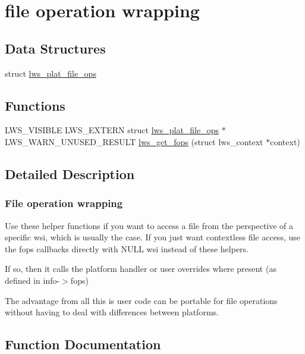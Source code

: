 \hypertarget{group__fops}{}\section{file operation wrapping}
\label{group__fops}
\subsection*{Data Structures}
\begin{DoxyCompactItemize}
\item 
struct \hyperlink{structlws__plat__file__ops}{lws\+\_\+plat\+\_\+file\+\_\+ops}
\end{DoxyCompactItemize}
\subsection*{Functions}
\begin{DoxyCompactItemize}
\item 
L\+W\+S\+\_\+\+V\+I\+S\+I\+B\+LE L\+W\+S\+\_\+\+E\+X\+T\+E\+RN struct \hyperlink{structlws__plat__file__ops}{lws\+\_\+plat\+\_\+file\+\_\+ops} $\ast$L\+W\+S\+\_\+\+W\+A\+R\+N\+\_\+\+U\+N\+U\+S\+E\+D\+\_\+\+R\+E\+S\+U\+LT \hyperlink{group__fops_gac08aef64c4c34647ed699b24759b6b0e}{lws\+\_\+get\+\_\+fops} (struct lws\+\_\+context $\ast$context)
\end{DoxyCompactItemize}


\subsection{Detailed Description}
\subsubsection*{File operation wrapping}

Use these helper functions if you want to access a file from the perspective of a specific wsi, which is usually the case. If you just want contextless file access, use the fops callbacks directly with N\+U\+LL wsi instead of these helpers.

If so, then it calls the platform handler or user overrides where present (as defined in info-\/$>$fops)

The advantage from all this is user code can be portable for file operations without having to deal with differences between platforms. 

\subsection{Function Documentation}
